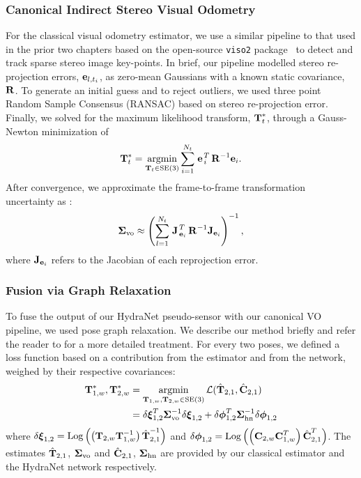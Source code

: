 \subsubsection{Canonical Indirect Stereo Visual Odometry}
For the classical visual odometry estimator, we use a similar pipeline to that used in the prior two chapters based on the open-source \texttt{viso2} package~\citep{Geiger2011-xe} to detect and track sparse stereo image key-points. In brief, our pipeline modelled stereo re-projection errors, $ \boldsymbol{\mathbf{e}}_{l,t_i}$, as zero-mean Gaussians with a known static covariance, $\boldsymbol{\mathbf{R}}$. To generate an initial guess and to reject outliers, we used three point Random Sample Consensus (RANSAC) based on stereo re-projection error.
Finally, we solved for the maximum likelihood transform, $\boldsymbol{\mathbf{T}}_t^*$, through a Gauss-Newton minimization of\begin{equation}
  \boldsymbol{\mathbf{T}}_{t}^* = \operatorname*{argmin}_{\boldsymbol{\mathbf{T}}_{t}\in\text{SE}(3)}\sum_{i=1}^{N_{t}} 
  \left.{\boldsymbol{\mathbf{e}}}\right.^T_{i} \boldsymbol{\mathbf{R}}^{-1} \boldsymbol{\mathbf{e}}_{i}.
\end{equation}
\noindent After convergence, we approximate the frame-to-frame transformation uncertainty as \citep{Barfoot2017-ri}:
\begin{equation}
	\boldsymbol{\mathbf{\Sigma}}_\text{vo} \approx  \left( \sum_{l=1}^{N_t} \left.{\boldsymbol{\mathbf{J}}}\right.^T_{\boldsymbol{\mathbf{e}}_i} \boldsymbol{\mathbf{R}}^{-1} \boldsymbol{\mathbf{J}}_{\boldsymbol{\mathbf{e}}_i} \right)^{-1},
    \label{eq:svo_uncertainty}
\end{equation}
where $\boldsymbol{\mathbf{J}}_{\boldsymbol{\mathbf{e}}_i}$ refers to the Jacobian of each reprojection error.

\subsubsection{Fusion via Graph Relaxation}

To fuse the output of our HydraNet pseudo-sensor with our canonical VO pipeline, we used pose graph relaxation. We describe our method briefly and refer the reader to \citep{Barfoot2017-ri} for a more detailed treatment. For every two poses, we defined a loss function based on a contribution from the estimator and from the network, weighed by their respective covariances:
\begin{align}
	\boldsymbol{\mathbf{T}}_{1,w}^*, \boldsymbol{\mathbf{T}}_{2,w}^* &= \operatorname*{argmin}_{\boldsymbol{\mathbf{T}}_{1,w}, \boldsymbol{\mathbf{T}}_{2,w}\in\text{SE}(3)}\mathcal{L}(\hat{\boldsymbol{\mathbf{T}}}_{2,1}, \hat{\boldsymbol{\mathbf{C}}}_{2,1}) \\ & = \delta\boldsymbol{\mathbf{\xi}}_\text{1,2}^T \boldsymbol{\mathbf{\Sigma}}^{-1}_\text{vo} \delta\boldsymbol{\mathbf{\xi}}_\text{1,2} + \delta\boldsymbol{\mathbf{\phi}}_\text{1,2}^T \boldsymbol{\mathbf{\Sigma}}^{-1}_{\text{hn}} \delta\boldsymbol{\mathbf{\phi}}_\text{1,2} 
\end{align}
where $\delta\boldsymbol{\mathbf{\xi}}_\text{1,2} =  \mathrm{Log}\left({\left(\boldsymbol{\mathbf{T}}_{2,w} \boldsymbol{\mathbf{T}}_{1,w}^{-1} \right)\hat{\boldsymbol{\mathbf{T}}}_{2,1}^{-1}}\right)$ and
$\delta\boldsymbol{\mathbf{\phi}}_\text{1,2} =  \mathrm{Log}\left({\left(\boldsymbol{\mathbf{C}}_{2,w} \boldsymbol{\mathbf{C}}_{1,w}^{T} \right)\hat{\boldsymbol{\mathbf{C}}}_{2,1}^{T}}\right)$.
The estimates $\hat{\boldsymbol{\mathbf{T}}}_{2,1}$, $\boldsymbol{\mathbf{\Sigma}}_\text{vo}$ and $\hat{\boldsymbol{\mathbf{C}}}_{2,1}$, $\boldsymbol{\mathbf{\Sigma}}_{\text{hn}}$ are provided by our classical estimator and the HydraNet network respectively.  

